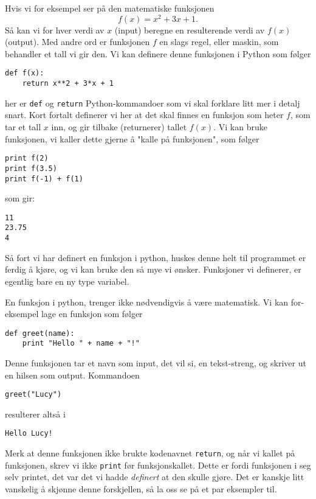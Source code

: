 \documentclass[a4paper, 11pt, notitlepage, english]{article}
\begin{document}
Hvis vi for eksempel ser på den matematiske funksjonen
$$f(x) = x^2 + 3x + 1.$$
Så kan vi for hver verdi av $x$ (input) beregne en resulterende verdi av $f(x)$ (output). Med andre ord er funksjonen $f$ en slags regel, eller maskin, som behandler et tall vi gir den. Vi kan definere denne funksjonen i Python som følger
\begin{lstlisting}
def f(x):
    return x**2 + 3*x + 1    
\end{lstlisting}
\vspace{-0.3cm}
her er \verb+def+ og \verb+return+ Python-kommandoer som vi skal forklare litt mer i detalj snart. Kort fortalt definerer vi her at det skal finnes en funksjon som heter $f$, som tar et tall $x$ inn, og gir tilbake (returnerer) tallet $f(x)$. Vi kan bruke funksjonen, vi kaller dette gjerne å "kalle på funksjonen", som følger
\begin{lstlisting}
print f(2)
print f(3.5)
print f(-1) + f(1)
\end{lstlisting}
\vspace{-0.3cm}
som gir:
\begin{lstlisting}
11
23.75
4
\end{lstlisting}
\vspace{-0.3cm}
Så fort vi har definert en funksjon i python, huskes denne helt til programmet er ferdig å kjøre, og vi kan bruke den så mye vi ønsker. Funksjoner vi definerer, er egentlig bare en ny type variabel.

En funksjon i python, trenger ikke nødvendigvis å være matematisk. Vi kan for-eksempel lage en funksjon som følger
\begin{lstlisting}
def greet(name):
    print "Hello " + name + "!"
\end{lstlisting}
\vspace{-0.3cm}
Denne funksjonen tar et navn som input, det vil si, en tekst-streng, og skriver ut en hilsen som output. Kommandoen
\begin{lstlisting}
greet("Lucy")
\end{lstlisting}
\vspace{-0.3cm}
resulterer altså i
\begin{lstlisting}
Hello Lucy!
\end{lstlisting}
\vspace{-0.3cm}
Merk at denne funksjonen ikke brukte kodenavnet \verb+return+, og når vi kallet på funksjonen, skrev vi ikke \verb+print+ før funksjonskallet. Dette er fordi funksjonen i seg selv printet, det var det vi hadde \emph{definert} at den skulle gjøre. Det er kanskje litt vanskelig å skjønne denne forskjellen, så la oss se på et par eksempler til.
\end{document}
